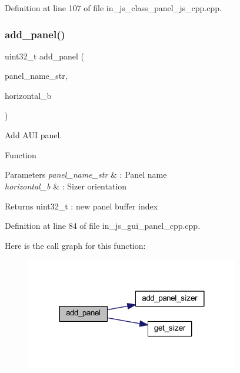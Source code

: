 Definition at line 107 of file in\+\_\+js\+\_\+class\+\_\+panel\+\_\+js\+\_\+cpp.\+cpp.

\mbox{\label{group___panel_ga1c59e19c2b6fb7c164fbf334fb5fa7f6}} 
\subsubsection{add\_panel()}
{\footnotesize\ttfamily uint32\+\_\+t add\+\_\+panel (\begin{DoxyParamCaption}\item[{wx\+String}]{panel\+\_\+name\+\_\+str,  }\item[{bool}]{horizontal\+\_\+b }\end{DoxyParamCaption})}



Add A\+UI panel. 

Function
\begin{DoxyParams}{Parameters}
{\em panel\+\_\+name\+\_\+str} & \+: Panel name \\
\hline
{\em horizontal\+\_\+b} & \+: Sizer orientation \\
\hline
\end{DoxyParams}
\begin{DoxyReturn}{Returns}
uint32\+\_\+t \+: new panel buffer index 
\end{DoxyReturn}


Definition at line 84 of file in\+\_\+js\+\_\+gui\+\_\+panel\+\_\+cpp.\+cpp.

Here is the call graph for this function\+:\nopagebreak
\begin{figure}[H]
\begin{center}
\leavevmode
\includegraphics[width=264pt]{group___panel_ga1c59e19c2b6fb7c164fbf334fb5fa7f6_cgraph}
\end{center}
\end{figure}
\mbox{\label{group___panel_ga90edbd17cb06193898dc67904b748a12}} 

